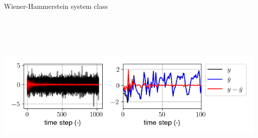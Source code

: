 \documentclass[a0,portrait]{a0poster}
\begin{document}
\begin{multicols}{2}
\begin{center}
Wiener-Hammerstein system class\\
\includegraphics[height=9cm]{figures/wh_one_step_batch_single.png}
\end{center}%


\end{multicols}
\end{document}
